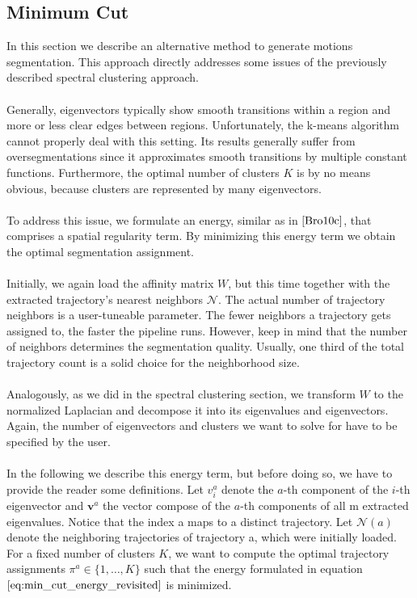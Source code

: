 \subsection{Minimum Cut} 
In this section we describe an alternative method to generate motions segmentation. This approach directly addresses some issues of the previously described spectral clustering approach. \\ \\
Generally, eigenvectors typically show smooth transitions within a region and more or less clear edges between regions. Unfortunately, the k-means algorithm cannot properly deal with this setting. Its results generally suffer from oversegmentations since it approximates smooth transitions by multiple constant functions. Furthermore, the optimal number of clusters $K$ is by no means obvious, because clusters are represented by many eigenvectors. \\ \\
To address this issue, we formulate an energy, similar as in $\cite{Bro10c}$, that comprises a spatial regularity term. By minimizing this energy term we obtain the optimal segmentation assignment. \\ \\
Initially, we again load the affinity matrix $W$, but this time together with the extracted trajectory's nearest neighbors $\mathcal{N}$. The actual number of trajectory neighbors is a user-tuneable parameter. The fewer neighbors a trajectory gets assigned to, the faster the pipeline runs. However, keep in mind that the number of neighbors determines the segmentation quality. Usually, one third of the total trajectory count is a solid choice for the neighborhood size. \\ \\ 
Analogously, as we did in the spectral clustering section, we transform $W$ to the normalized Laplacian and decompose it into its eigenvalues and eigenvectors. Again, the number of eigenvectors and clusters we want to solve for have to be specified by the user. \\ \\
In the following we describe this energy term, but before doing so, we have to provide the reader some definitions. Let $v_i^a$ denote the $a$-th component of the $i$-th eigenvector and $\textbf{v}^a$ the vector compose of the $a$-th components of all m extracted eigenvalues. Notice that the index a maps to a distinct trajectory. Let $\mathcal{N} \left( a \right)$ denote the neighboring trajectories of trajectory a, which were initially loaded. For a fixed number of clusters $K$, we want to compute the optimal trajectory assignments $\pi^{a} \in \{ 1, \dots , K \}$ such that the energy formulated in equation $\ref{eq:min_cut_energy_revisited}$ is minimized.
